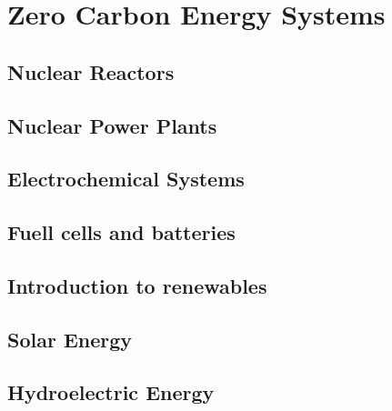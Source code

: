 \chapter{Zero Carbon Energy Systems}
\section{Nuclear Reactors}
\section{Nuclear Power Plants}
\section{Electrochemical Systems}
\section{Fuell cells and batteries}
\section{Introduction to renewables}
\section{Solar Energy}
\section{Hydroelectric Energy}


